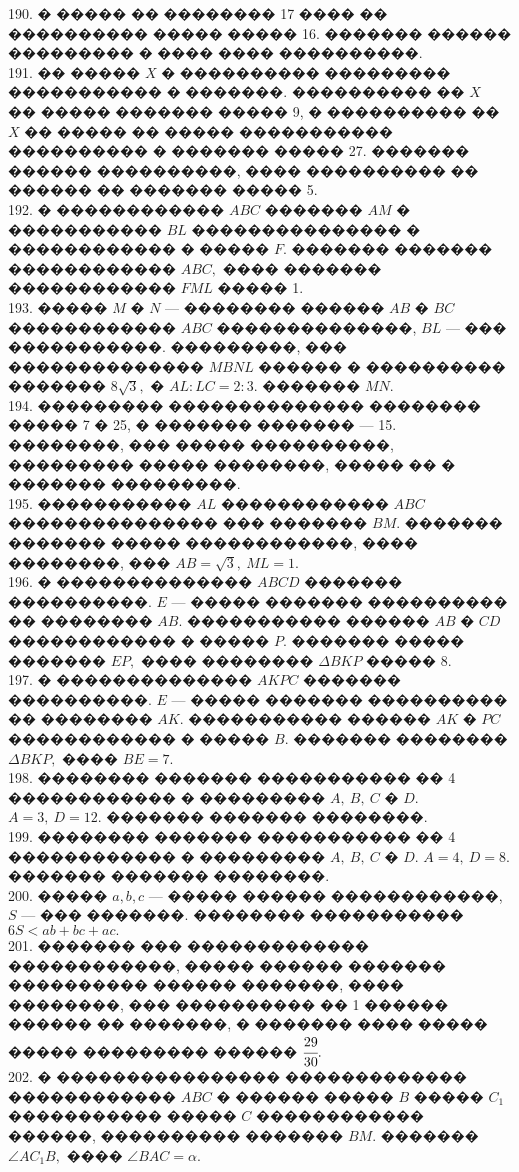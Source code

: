 \documentclass[12pt]{article}
\begin{document}
190. � ����� �� �������� 17 ���� �� ���������� ����� ����� 16. ������� ������ ��������� � ���� ���� ����������.\\
191. �� ����� $X$ � ���������� ��������� ����������� � �������. ���������� �� $X$ �� ����� ������� ����� 9, � ���������� �� $X$ �� ����� �� ����� ����������� ���������� � ������� ����� 27. ������� ������ ����������, ���� ���������� �� ������ �� ������� ����� 5.\\
192. � ������������ $ABC$ ������� $AM$ � ����������� $BL$ ��������������� � ������������ � ����� $F.$ ������� ������� ������������ $ABC,$ ���� ������� ������������ $FML$ ����� 1.\\
193. ����� $M$ � $N$ --- �������� ������ $AB$ � $BC$ ������������ $ABC$ ��������������, $BL$ --- ��� �����������. ���������, ��� �������������� $MBNL$ ������ � ���������� ������� $8\sqrt{3},$ � $AL:LC=2:3.$ ������� $MN.$\\
194. ��������� �������������� �������� ����� 7 � 25, � ������� ������� --- 15. ��������, ��� ����� ����������, ��������� ����� ��������, ����� �� � ������� ���������.\\
195. ����������� $AL$ ������������ $ABC$ ��������������� ��� ������� $BM.$ ������� ������� ����� ������������, ���� ��������, ��� $AB=\sqrt{3},\ ML=1.$\\
196. � �������������� $ABCD$ ������� ����������. $E$ --- ����� ������� ���������� �� �������� $AB.$ ����������� ������ $AB$ � $CD$ ������������ � ����� $P.$ ������� ����� ������� $EP,$ ���� �������� $\Delta BKP$ ����� 8.\\
197. � �������������� $AKPC$ ������� ����������. $E$ --- ����� ������� ���������� �� �������� $AK.$ ����������� ������ $AK$ � $PC$ ������������ � ����� $B.$ ������� �������� $\Delta BKP,$ ���� $BE=7.$\\
198. �������� ������� ����������� �� 4 ������������ � ��������� $A,\ B,\ C$ � $D.$ $A=3,\ D=12.$ ������� ������� ��������.\\
199. �������� ������� ����������� �� 4 ������������ � ��������� $A,\ B,\ C$ � $D.$ $A=4,\ D=8.$ ������� ������� ��������.\\
200. ����� $a,b,c$ --- ����� ������ ������������, $S$ --- ��� �������. �������� ����������� $6S<ab+bc+ac.$\\
201. ������� ��� ������������� ������������, ����� ������ ������� ���������� ������ �������, ���� ��������, ��� ���������� �� 1 ������ ������ �� �������, � ������� ���� ����� ����� ��������� ������ $\cfrac{29}{30}.$\\
202. � ���������������� ������������� ������������ $ABC$ � ������ ����� $B$ ����� $C_1$ ����������� ����� $C$ ������������ ������, ���������� ������� $BM.$ ������� $\angle AC_1B,$ ���� $\angle BAC=\alpha.$\\
\end{document}
